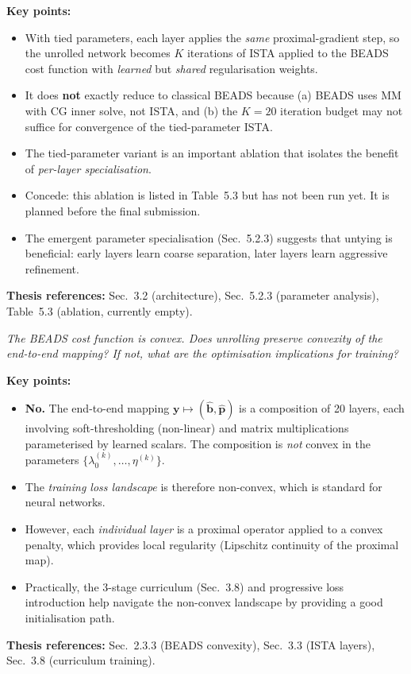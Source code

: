 \documentclass[11pt, letterpaper]{article}
\newcounter{qcounter}
\newcommand{\question}[1]{%
  \stepcounter{qcounter}%
  \begin{questionbox}[Q\theqcounter]%
    \itshape #1%
  \end{questionbox}%
}
\begin{document}
\begin{answerbox}
\textbf{Key points:}
\begin{itemize}[nosep]
  \item With tied parameters, each layer applies the \emph{same}
        proximal-gradient step, so the unrolled network becomes
        $K$ iterations of ISTA applied to the BEADS cost function
        with \emph{learned} but \emph{shared} regularisation weights.
  \item It does \textbf{not} exactly reduce to classical BEADS because
        (a) BEADS uses MM with CG inner solve, not ISTA, and (b) the
        $K=20$ iteration budget may not suffice for convergence of the
        tied-parameter ISTA.
  \item The tied-parameter variant is an important ablation that
        isolates the benefit of \emph{per-layer specialisation}.
  \item Concede: this ablation is listed in Table~5.3 but has not
        been run yet.  It is planned before the final submission.
  \item The emergent parameter specialisation (Sec.~5.2.3) suggests
        that untying is beneficial: early layers learn coarse
        separation, later layers learn aggressive refinement.
\end{itemize}
\textbf{Thesis references:} Sec.~3.2 (architecture), Sec.~5.2.3 (parameter analysis), Table~5.3 (ablation, currently empty).
\end{answerbox}

\question{The BEADS cost function is convex.  Does unrolling preserve
convexity of the end-to-end mapping?  If not, what are the
optimisation implications for training?}

\begin{answerbox}
\textbf{Key points:}
\begin{itemize}[nosep]
  \item \textbf{No.}  The end-to-end mapping
        $\mathbf{y}\mapsto(\hat{\mathbf{b}},\hat{\mathbf{p}})$ is a
        composition of 20 layers, each involving soft-thresholding
        (non-linear) and matrix multiplications parameterised by
        learned scalars.  The composition is \emph{not} convex in the
        parameters $\{\lambda_0^{(k)},\ldots,\eta^{(k)}\}$.
  \item The \emph{training loss landscape} is therefore non-convex,
        which is standard for neural networks.
  \item However, each \emph{individual layer} is a proximal operator
        applied to a convex penalty, which provides local regularity
        (Lipschitz continuity of the proximal map).
  \item Practically, the 3-stage curriculum (Sec.~3.8) and progressive
        loss introduction help navigate the non-convex landscape by
        providing a good initialisation path.
\end{itemize}
\textbf{Thesis references:} Sec.~2.3.3 (BEADS convexity), Sec.~3.3 (ISTA layers), Sec.~3.8 (curriculum training).
\end{answerbox}
\end{document}

